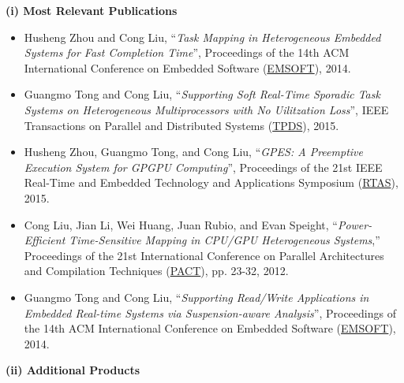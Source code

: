 \documentclass[10pt,letterpaper]{article}
\begin{document}
\hspace{-4mm} \textbf{(i) Most Relevant Publications}\  
	\vspace{-1mm}
	\begin{itemize}

\item 
Husheng Zhou and Cong Liu, ``\textit{Task Mapping in Heterogeneous Embedded Systems for Fast Completion Time}'', Proceedings of the 14th ACM International Conference on Embedded Software (\underline{EMSOFT}), 2014.

\item
Guangmo Tong and Cong Liu, ``\textit{Supporting Soft Real-Time Sporadic Task Systems on Heterogeneous Multiprocessors with No Uilitzation Loss}'', IEEE Transactions on Parallel and Distributed Systems (\underline{TPDS}), 2015.

	
\item
Husheng Zhou, Guangmo Tong, and Cong Liu, ``\textit{GPES: A Preemptive Execution System for GPGPU Computing}'', Proceedings of the 21st IEEE Real-Time and Embedded Technology and Applications Symposium (\underline{RTAS}), 2015.


\item  	Cong Liu, Jian Li, Wei Huang, Juan Rubio, and Evan Speight, ``\textit{Power-Efficient Time-Sensitive Mapping in CPU/GPU Heterogeneous Systems},'' Proceedings of the 21st International Conference on Parallel Architectures and Compilation Techniques (\underline{PACT}), pp. 23-32, 2012.

\item Guangmo Tong and Cong Liu, ``\textit{Supporting Read/Write Applications in Embedded Real-time Systems via Suspension-aware Analysis}'', Proceedings of the 14th ACM International Conference on Embedded Software (\underline{EMSOFT}), 2014.





\end{itemize}
\hspace{-4mm} \textbf{(ii) Additional Products}\  
\vspace{-1mm}
\end{document}
